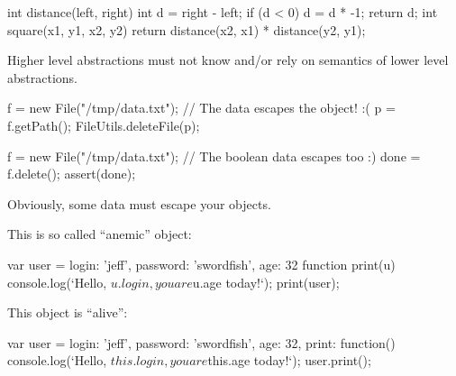 \documentclass{article}
\begin{document}
\begin{pptWide}{2}
{\small\begin{ffcode}
int distance(left, right) {
  int d = right - left;
  if (d < 0) { d = d * -1; }
  return d;
}
int square(x1, y1, x2, y2) {
  return distance(x2, x1)
    * distance(y2, y1);
}
\end{ffcode}
}
\par\columnbreak\par
{}
\end{pptWide}\par
Higher level abstractions must not know and/or rely on semantics of lower level abstractions.
\plush{}

\begin{pptWide}{2}
{\small\begin{ffcode}
f = new File("/tmp/data.txt");
// The data escapes the object! :(
p = f.getPath();
FileUtils.deleteFile(p);
\end{ffcode}
}
\par\columnbreak\par
{\small\begin{ffcode}
f = new File("/tmp/data.txt");
// The boolean data escapes too :)
done = f.delete();
assert(done);
\end{ffcode}
}
\end{pptWide}
\par
Obviously, some data must escape your objects.
\plush{}

\begin{pptWide}{2}
This is so called ``anemic'' object:
{\small\begin{ffcode}
var user = {
  login: 'jeff',
  password: 'swordfish',
  age: 32
}
function print(u) {
  console.log(`Hello, ${u.login},
    you are ${u.age} today!`);
}
print(user);
\end{ffcode}
}
\par\columnbreak\par
This object is ``alive'':
{\small\begin{ffcode}
var user = {
  login: 'jeff',
  password: 'swordfish',
  age: 32,
  print: function() {
    console.log(`Hello, ${this.login},
      you are ${this.age} today!`);
  }
}
user.print();
\end{ffcode}
}
\end{pptWide}
\par
\plush{}
\end{document}

